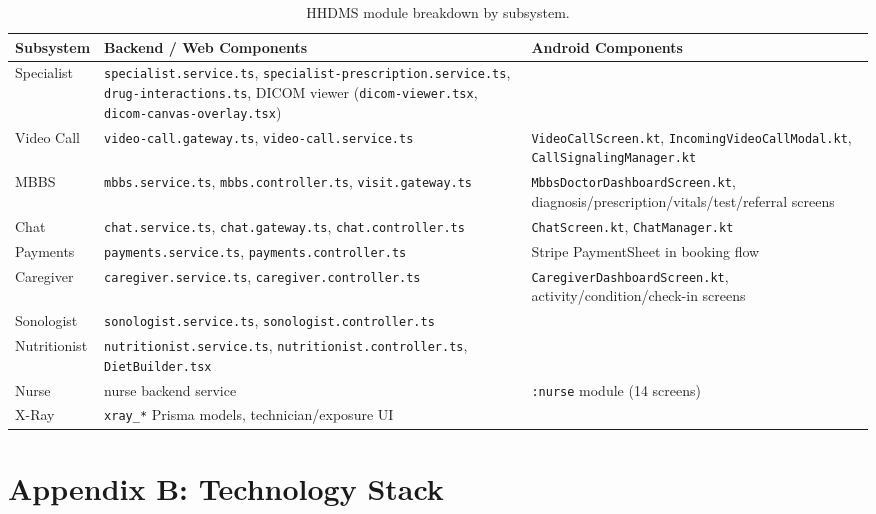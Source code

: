 \documentclass[conference]{IEEEtran}
\begin{document}
\begin{table}[H]
\centering
\small
\renewcommand{\arraystretch}{1.2}
\begin{tabularx}{\textwidth}{>{\raggedright\arraybackslash}p{} >{\raggedright\arraybackslash}X >{\raggedright\arraybackslash}X}
\toprule
\textbf{Subsystem} & \textbf{Backend / Web Components} & \textbf{Android Components} \\
\midrule
Specialist & \texttt{specialist.service.ts}, \texttt{specialist-prescription.service.ts}, \texttt{drug-interactions.ts}, DICOM viewer (\texttt{dicom-viewer.tsx}, \texttt{dicom-canvas-overlay.tsx}) & \multicolumn{1}{c}{---} \\
Video Call & \texttt{video-call.gateway.ts}, \texttt{video-call.service.ts} & \texttt{VideoCallScreen.kt}, \texttt{IncomingVideoCallModal.kt}, \texttt{CallSignalingManager.kt} \\
MBBS & \texttt{mbbs.service.ts}, \texttt{mbbs.controller.ts}, \texttt{visit.gateway.ts} & \texttt{MbbsDoctorDashboardScreen.kt}, diagnosis/prescription/vitals/test/referral screens \\
Chat & \texttt{chat.service.ts}, \texttt{chat.gateway.ts}, \texttt{chat.controller.ts} & \texttt{ChatScreen.kt}, \texttt{ChatManager.kt} \\
Payments & \texttt{payments.service.ts}, \texttt{payments.controller.ts} & Stripe PaymentSheet in booking flow \\
Caregiver & \texttt{caregiver.service.ts}, \texttt{caregiver.controller.ts} & \texttt{CaregiverDashboardScreen.kt}, activity/condition/check-in screens \\
Sonologist & \texttt{sonologist.service.ts}, \texttt{sonologist.controller.ts} & \multicolumn{1}{c}{---} \\
Nutritionist & \texttt{nutritionist.service.ts}, \texttt{nutritionist.controller.ts}, \texttt{DietBuilder.tsx} & \multicolumn{1}{c}{---} \\
Nurse & nurse backend service & \texttt{:nurse} module (14 screens) \\
X-Ray & \texttt{xray\_*} Prisma models, technician/exposure UI & \multicolumn{1}{c}{---} \\
\bottomrule
\end{tabularx}
\caption{HHDMS module breakdown by subsystem.}
\label{tab:modules}
\end{table}

\section*{Appendix B: Technology Stack}
\end{document}
